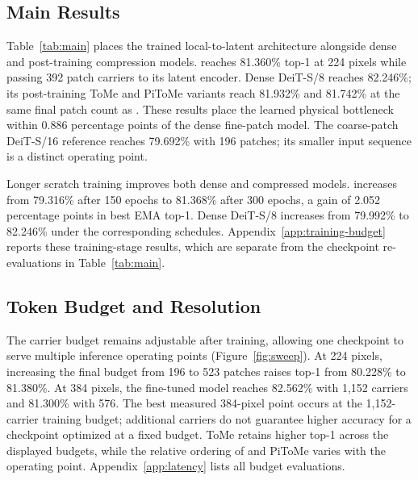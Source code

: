 \subsection{Main Results}
\label{sec:results}
\label{sec:primary-results}

Table~\ref{tab:main} places the trained local-to-latent architecture
alongside dense and post-training compression models. \mn{} reaches
81.360\% top-1 at 224 pixels while passing 392 patch carriers to its
latent encoder. Dense DeiT-S/8
reaches 82.246\%; its post-training ToMe and PiToMe variants reach
81.932\% and 81.742\% at the same final patch count as \mn{}.
These results place the learned physical bottleneck within 0.886
percentage points of the dense fine-patch model. The coarse-patch
DeiT-S/16 reference reaches 79.692\% with 196 patches; its smaller
input sequence is a distinct operating point.

\begin{table}[htbp]
\caption{ImageNet-1K top-1 at 224 pixels after 300-epoch scratch training.
ToMe and PiToMe reduce the trained DeiT-S/8 checkpoint at inference.
Patch counts exclude CLS.}
\label{tab:main}
\centering\small

\end{table}

Longer scratch training improves both dense and compressed models.
\mn{} increases from 79.316\% after 150 epochs to 81.368\% after
300 epochs, a gain of 2.052 percentage points in best EMA top-1.
Dense DeiT-S/8 increases from 79.992\% to 82.246\% under the
corresponding schedules. Appendix~\ref{app:training-budget} reports
these training-stage results, which are separate from the checkpoint
re-evaluations in Table~\ref{tab:main}.

\subsection{Token Budget and Resolution}
\label{sec:budget-resolution}

The carrier budget remains adjustable after training, allowing one
checkpoint to serve multiple inference operating points
(Figure~\ref{fig:sweep}). At 224 pixels,
increasing the final budget from 196 to 523 patches raises \mn{} top-1
from 80.228\% to 81.380\%. At 384 pixels, the fine-tuned model reaches
82.562\% with 1,152 carriers and 81.300\% with 576. The best measured
384-pixel point occurs at the 1,152-carrier training budget; additional
carriers do not guarantee higher accuracy for a checkpoint optimized at
a fixed budget.
ToMe retains higher top-1 across the displayed budgets, while the
relative ordering of \mn{} and PiToMe varies with the operating point.
Appendix~\ref{app:latency} lists all budget evaluations.


